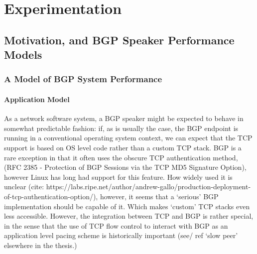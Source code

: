 \chapter{Experimentation}



\section{Motivation, and BGP Speaker Performance Models}

\subsection{A Model of BGP System Performance}

\subsubsection*{Application Model}
As a network software system, a BGP speaker might be expected to behave in somewhat predictable fashion: if, as is usually the case, the BGP endpoint is running in a conventional operating system context, we can expect that the TCP support is based on OS level code rather than a custom TCP stack.
BGP is a rare exception in that it often uses the obscure TCP authentication method, (RFC 2385 - Protection of BGP Sessions via the TCP MD5 Signature Option), however Linux has long had support for this feature.
How widely used it is unclear (cite: https://labs.ripe.net/author/andrew-gallo/production-deployment-of-tcp-authentication-option/), however, it seems that a `serious' BGP implementation should be capable of it.
Which makes `custom' TCP stacks even less accessible.
However, the integration between TCP and BGP is rather special, in the sense that the use of TCP flow control to interact with BGP as an application level pacing scheme is historically important (see/ ref `slow peer' elsewhere in the thesis.)

